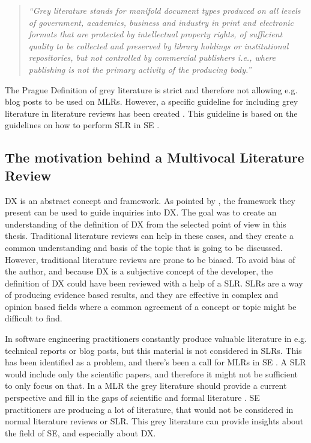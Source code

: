 \documentclass[english, 12pt, a4paper, sci, utf8, a-1b, online]{aaltothesis}
\begin{document}
\begin{quotation}
  \textit{``Grey literature stands for manifold document types produced on all levels of government, academics, business and industry in print and electronic formats that are protected by intellectual property rights, of sufficient quality to be collected and preserved by library holdings or institutional repositories, but not controlled by commercial publishers i.e., where publishing is not the primary activity of the producing body.''} \parencite{towards-a-prague-definition-of-grey-literature}
\end{quotation}

The Prague Definition of grey literature is strict and therefore not allowing e.g. blog posts to be used on MLRs. However, a specific guideline for including grey literature in literature reviews has been created \parencite{guidelines-for-MLR}. This guideline is based on the guidelines on how to perform SLR in SE \parencite{guidelines-for-SLR-in-SE}.

\subsection{The motivation behind a Multivocal Literature Review}

DX is an abstract concept and framework. As pointed by \textcite{fagerholm-doctoral-thesis}, the framework they present can be used to guide inquiries into DX. The goal was to create an understanding of the definition of DX from the selected point of view in this thesis. Traditional literature reviews can help in these cases, and they create a common understanding and basis of the topic that is going to be discussed. However, traditional literature reviews are prone to be biased. To avoid bias of the author, and because DX is a subjective concept of the developer, the definition of DX could have been reviewed with a help of a SLR. SLRs are a way of producing evidence based results, and they are effective in complex and opinion based fields where a common agreement of a concept or topic might be difficult to find.

In software engineering practitioners constantly produce valuable literature in e.g. technical reports or blog posts, but this material is not considered in SLRs. This has been identified as a problem, and there's been a call for MLRs in SE \parencite{the-need-for-MLR}. A SLR would include only the scientific papers, and therefore it might not be sufficient to only focus on that. In a MLR the grey literature should provide a current perspective and fill in the gaps of scientific and formal literature \parencite{guidelines-for-MLR}. SE practitioners are producing a lot of literature, that would not be considered in normal literature reviews or SLR. This grey literature can provide insights about the field of SE, and especially about DX.
\end{document}
